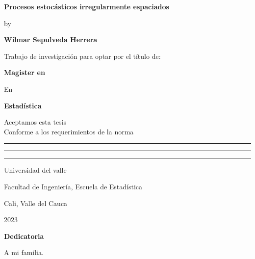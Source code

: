 \begin{center}
\textbf{\huge Procesos estocásticos irregularmente espaciados}\vspace*{1.0cm}

by\vspace*{0.5cm}

\Large\textbf{Wilmar Sepulveda Herrera}\vspace*{1.0cm}

\small Trabajo de investigación para optar por el título de:\vspace*{1.0cm}

\textbf{Magister en}\vspace*{0.5cm}

En\vspace*{0.5cm}

\textbf{Estadística}\vspace*{1.5cm}

Aceptamos esta tesis\\
Conforme a los requerimientos de la norma\vspace*{1.0cm}

\rule{10cm}{1pt}\vspace*{0.7cm}
\rule{10cm}{1pt}\vspace*{0.7cm}
\rule{10cm}{1pt}\vspace*{2.3cm}

\small Universidad del valle

Facultad de Ingeniería, Escuela de Estadística

Cali, Valle del Cauca

2023
\end{center}

\newpage

\thispagestyle{empty}

\vspace*{1cm}

\textbf{\LARGE Dedicatoria}\vspace*{4.0cm}

\begin{flushright}
\begin{minipage}{8cm}
A mi familia.
\end{minipage}
\end{flushright}

\newpage{\pagestyle{empty}\cleardoublepage}

